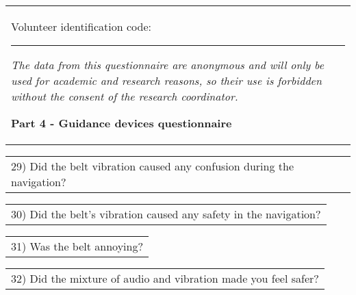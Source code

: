 \begin{table}[!thb]
    \begin{tabular}{m{1\linewidth}}

        {\color{gray}

        Volunteer identification code: \rule{1in}{.2mm}
        
        \textit{The data from this questionnaire are anonymous and will only be used for academic and research reasons, so their use is forbidden without the consent of the research coordinator.}
        }
        
        \begin{center}
        \textbf{Part 4 - Guidance devices questionnaire}
        \end{center}
        
    \end{tabular}
%

    \begin{tabular}{m{1\linewidth}}
        \vspace{1ex}
        29)	Did the belt vibration caused any confusion during the navigation?
    \end{tabular}

    
    

    \begin{tabular}{m{1\linewidth}}
        \vspace{1ex}
        30)	Did the belt's vibration caused any safety in the navigation?
    \end{tabular}

    
    

    \begin{tabular}{m{1\linewidth}}
        \vspace{1ex}
        31)	Was the belt annoying?
    \end{tabular}

    
    

    \begin{tabular}{m{1\linewidth}}
        \vspace{1ex}
        32)	Did the mixture of audio and vibration made you feel safer?
    \end{tabular}


\end{table}
